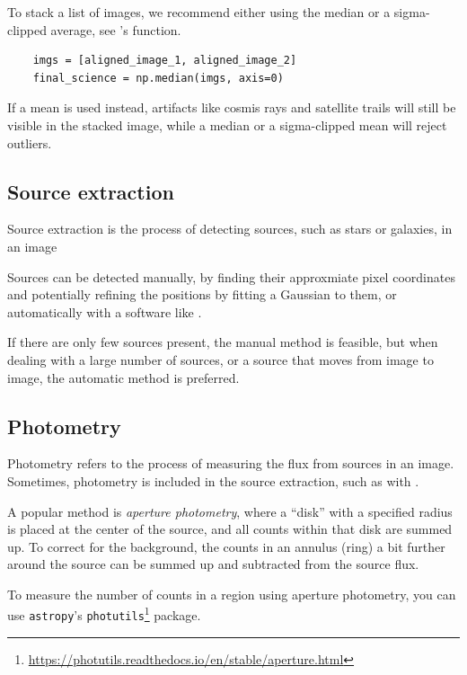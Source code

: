 \documentclass[a4paper, 11pt, fleqn]{memoir}
\begin{document}
To stack a list of images, we recommend either using the median or a sigma-clipped average, see 's  function.
\begin{verbatim}
    imgs = [aligned_image_1, aligned_image_2]
    final_science = np.median(imgs, axis=0)
\end{verbatim}
If a mean is used instead, artifacts like cosmis rays and satellite trails will still be visible in the stacked image, while a median or a sigma-clipped mean will reject outliers.

\subsection{Source extraction}
\label{ssec:source-extraction}

Source extraction is the process of detecting sources, such as stars or galaxies, in an image

Sources can be detected manually, by finding their approxmiate pixel coordinates and potentially refining the positions by fitting a Gaussian to them, or automatically with a software like .

If there are only few sources present, the manual method is feasible, but when dealing with a large number of sources, or a source that moves from image to image, the automatic method is preferred.


\subsection{Photometry}
\label{ssec:photometry}

Photometry refers to the process of measuring the flux from sources in an image.
Sometimes, photometry is included in the source extraction, such as with .

A popular method is \emph{aperture photometry}, where a \enquote{disk} with a specified radius is placed at the center of the source, and all counts within that disk are summed up.
To correct for the background, the counts in an annulus (ring) a bit further around the source can be summed up and subtracted from the source flux.

To measure the number of counts in a region using aperture photometry, you can use \texttt{astropy}'s \texttt{photutils}\footnote{\url{https://photutils.readthedocs.io/en/stable/aperture.html}} package.
\end{document}
